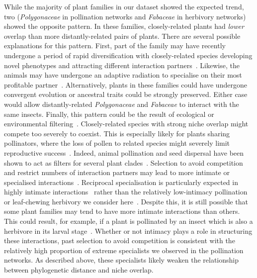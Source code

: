 \documentclass[12pt]{article}
\begin{document}
\begin{spacing}{1.5}
  While the majority of plant families in our dataset showed the 
  expected trend, two (\emph{Polygonaceae} in pollination networks and \emph{Fabaceae} in herbivory networks) showed the opposite 
  pattern. In these families, closely-related plants had 
  \emph{lower} overlap than more distantly-related pairs of plants. 
  There are several possible explanations for this pattern. 
  First, part of the family may have recently 
  undergone a period of rapid diversification with closely-related species 
  developing novel phenotypes and attracting different  
  interaction partners~\citep{Linder2008,Breitkopf2015}. Likewise, the
  animals may have undergone an adaptive radiation to 
  specialise on their most profitable partner~\citep{Janz2006}. 
  Alternatively, plants in these families could have undergone convergent evolution or ancestral traits could be strongly preserved. Either case would allow 
  distantly-related \emph{Polygonaceae} and \emph{Fabaceae} to interact with the same insects. 
  Finally, this pattern could be the result of ecological or environmental 
  filtering~\citep{Ackerly2003,Mayfield2009}. 
  Closely-related species with strong niche overlap might compete too severely to coexist. 
  This is especially likely
  for plants sharing pollinators, where the loss of pollen to related species 
  might severely limit reproductive success~\citep{Levin1970,Bell2005,Mitchell2009}.
  Indeed, animal pollination and seed dispersal have been shown to act
  as filters for several plant clades~\citep{Mayfield2009}. Selection to avoid 
  competition and restrict numbers of interaction partners may lead to
  more intimate or specialised interactions~\citep{Ponisio2017}. 
  Reciprocal specialisation is particularly expected in highly intimate interactions~\citep{Hembry2018} rather than the relatively low-intimacy pollination or leaf-chewing herbivory we consider here~\citep{Astegiano2017}.
  Despite this, it is still possible that some plant families may tend to have more intimate interactions than others. This could result, for example, if a plant is pollinated by an insect which is also a herbivore in its larval stage~\citep{Hembry2018}. 
  Whether or not intimacy plays a role in structuring these interactions, past selection to avoid competition is 
  consistent with the relatively high proportion of extreme specialists we
  observed in the pollination networks. As described above, these specialists likely weaken the relationship between phylogenetic distance and niche overlap.



\end{spacing}
\end{document}
